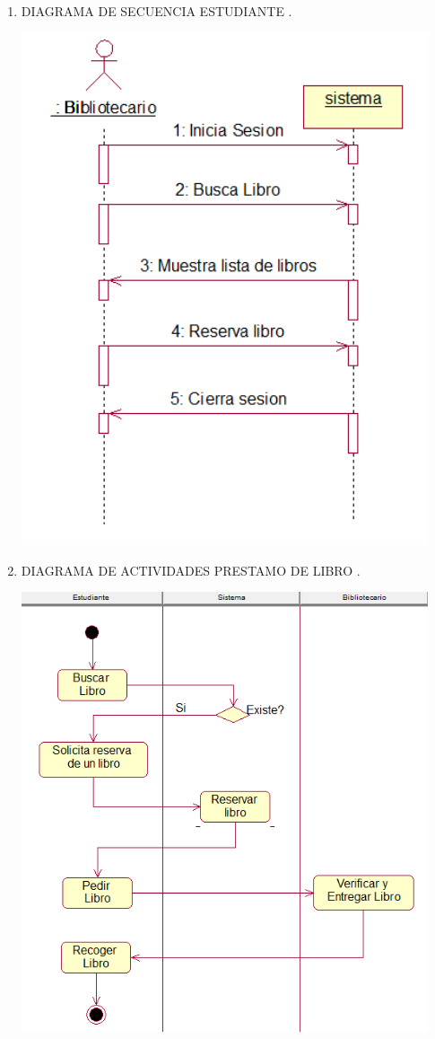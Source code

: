 \begin{enumerate}[1.]
\newpage
	\item DIAGRAMA DE SECUENCIA ESTUDIANTE .\\
	\begin{center}
	\includegraphics[width=12cm]{./Imagenes/img5} 
	\end{center}
	\newpage
\item DIAGRAMA DE ACTIVIDADES PRESTAMO DE LIBRO .\\
	\begin{center}
	\includegraphics[width=12cm]{./Imagenes/img6} 
	\end{center}
\end{enumerate} 
